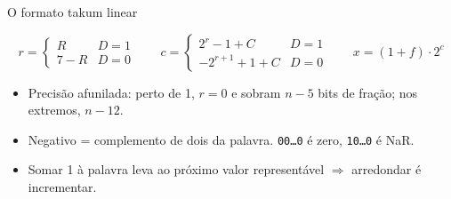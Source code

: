 \documentclass[aspectratio=169,10pt]{beamer}
\newcommand{\code}[1]{\texttt{#1}}
\begin{document}
\begin{frame}{O formato takum linear}
  \centering
  \[
    r = \begin{cases} R & D=1\\ 7-R & D=0\end{cases}\qquad
    c = \begin{cases} 2^r-1+C & D=1\\ -2^{r+1}+1+C & D=0\end{cases}\qquad
    x = (1+f)\cdot 2^{c}
  \]
  \begin{itemize}
    \item Precisão afunilada: perto de 1, $r=0$ e sobram $n-5$ bits de fração; nos extremos, $n-12$.
    \item Negativo = complemento de dois da palavra. \code{00\ldots0} é zero, \code{10\ldots0} é NaR.
    \item Somar 1 à palavra leva ao próximo valor representável $\Rightarrow$ arredondar é incrementar.
  \end{itemize}
\end{frame}
\end{document}
